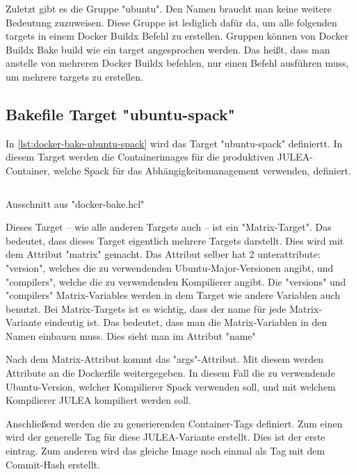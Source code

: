 Zuletzt gibt es die Gruppe "ubuntu". Den Namen braucht man keine weitere Bedeutung zuzuweisen. Diese Gruppe ist lediglich dafür da, um alle folgenden targets in einem Docker Buildx Befehl zu erstellen. Gruppen können von Docker Buildx Bake build wie ein target angesprochen werden. Das heißt, dass man anstelle von mehreren Docker Buildx befehlen, nur einen Befehl ausführen muss, um mehrere targets zu erstellen.

\subsection{Bakefile Target "ubuntu-spack"} \label{ubuntu-spack-target}

In \cref{lst:docker-bake-ubuntu-spack} wird das Target "ubuntu-spack" definiertt. In diesem Target werden die Containerimages für die produktiven JULEA-Container, welche Spack für das Abhängigkeitsmanagement verwenden, definiert.

\begin{listing}[H]
    \inputminted[firstline=9,lastline=27]{./lexers/docker-bake-lexer.py}{./code-examples/docker-bake.hcl}
    \caption{Ausschnitt aus "docker-bake.hcl"}
    \label{lst:docker-bake-ubuntu-spack}
\end{listing}


Dieses Target – wie alle anderen Targets auch – ist ein "Matrix-Target". Das bedeutet, dass dieses Target eigentlich mehrere Targets darstellt. Dies wird mit dem Attribut "matrix" gemacht. Das Attribut selber hat 2 unterattribute: "version", welches die zu verwendenden Ubuntu-Major-Versionen angibt, und "compilers", welche die zu verwendenden Kompilierer angibt.
Die "versions" und "compilers" Matrix-Variables werden in dem Target wie andere Variablen auch benutzt. 
Bei Matrix-Targets ist es wichtig, dass der name für jede Matrix-Variante eindeutig ist. Das bedeutet, dass man die Matrix-Variablen in den Namen einbauen muss. Dies sieht man im Attribut "name"

Nach dem Matrix-Attribut kommt das "args"-Attribut. Mit diesem werden Attribute an die Dockerfile weitergegeben. In diesem Fall die zu verwendende Ubuntu-Version, welcher Kompilierer Spack verwenden soll, und mit welchem Kompilierer JULEA kompiliert werden soll. 

Anschließend werden die zu generierenden Container-Tags definiert. Zum einen wird der generelle Tag für diese JULEA-Variante erstellt. Dies ist der erste eintrag. Zum anderen wird das gleiche Image noch einmal als Tag mit dem Commit-Hash erstellt.

